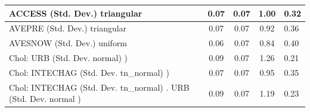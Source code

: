 \begin{table}
\begin{center}
\begin{tabular}{|l|l|c|c|c|l|}
			\hline
			ACCESS (Std. Dev.) triangular &  & 0.07 & 0.07 & 1.00 & 0.32 \\
			\hline
			AVEPRE (Std. Dev.) triangular &  & 0.07 & 0.07 & 0.92 & 0.36 \\
			\hline
			AVESNOW (Std. Dev.) uniform &  & 0.06 & 0.07 & 0.84 & 0.40 \\
			\hline
			 Chol: URB (Std. Dev. normal) ) &  & 0.09 & 0.07 & 1.26 & 0.21 \\
			\hline
			 Chol: INTECHAG (Std. Dev. tn_normal) ) &  & 0.07 & 0.07 & 0.95 & 0.35 \\
			\hline
			 Chol: INTECHAG (Std. Dev. tn_normal) . URB (Std. Dev.   normal ) &  & 0.09 & 0.07 & 1.19 & 0.23 \\
			\hline
		\end{tabular}
	\end{center}
\end{table}